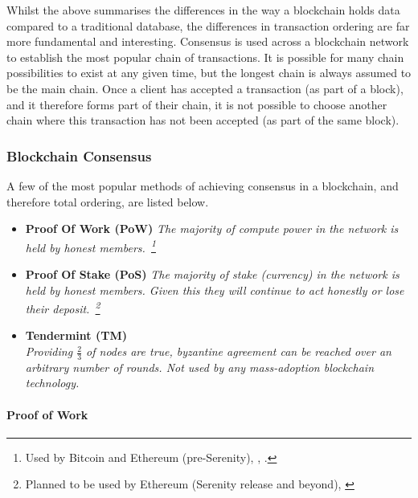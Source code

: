 Whilst the above summarises the differences in the way a blockchain holds data compared to a traditional database, the differences in transaction ordering are far more fundamental and interesting. Consensus is used across a blockchain network to establish the most popular chain of transactions. It is possible for many chain possibilities to exist at any given time, but the longest chain is always assumed to be the main chain. Once a client has accepted a transaction (as part of a block), and it therefore forms part of their chain, it is not possible to choose another chain where this transaction has not been accepted (as part of the same block).

\subsubsection{Blockchain Consensus}

A few of the most popular methods of achieving consensus in a blockchain, and therefore total ordering, are listed below.

\begin{itemize}
  \item
    \textbf{Proof Of Work (PoW)}
    \textit{The majority of compute power in the network is held by honest members.~\footnote{Used by Bitcoin and Ethereum (pre-Serenity), \cite{bitcoinwiki:2017:online}, \cite{cryptocompare:2017:online}.}}
  \item
    \textbf{Proof Of Stake (PoS)}
    \textit{The majority of stake (currency) in the network is held by honest members. Given this they will continue to act honestly or lose their deposit.~\footnote{Planned to be used by Ethereum (Serenity release and beyond), \cite{cryptocompare:2017:online}}}
  \item
    \textbf{Tendermint (TM)} \\
    \textit{Providing $\frac{2}{3}$ of nodes are true, byzantine agreement can be reached over an arbitrary number of rounds. Not used by any mass-adoption blockchain technology.}
\end{itemize}

\paragraph{Proof of Work}

